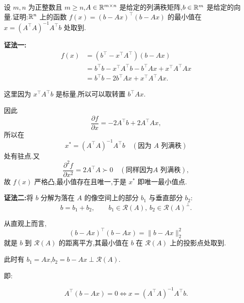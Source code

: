 \begin{problem}
设 $m,n$ 为正整数且 $m\ge n$,$A\in\mathbb{R}^{m\times n}$ 是给定的列满秩矩阵,$b\in\mathbb{R}^m$ 是给定的向量.证明:$\mathbb{R}^n$ 上的函数
\(
f(x)=(b-Ax)^\top(b-Ax)
\)
的最小值在
\(
x=(A^\top A)^{-1}A^\top b
\)
处取到.
\begin{solution}
\textbf{证法一:}
\begin{align*}
    f(x)&=(b^\top-x^\top A^\top)(b-Ax) \\
&=b^\top b-x^\top A^\top b-b^\top Ax+x^\top A^\top Ax \\
&=b^\top b-2b^\top Ax+x^\top A^\top Ax.
\end{align*}

这里因为 $x^\top A^\top b$ 是标量,所以可以取转置 $b^\top Ax$. 

因此
\[
\frac{\partial f}{\partial x}
=-2A^\top b+2A^\top Ax,
\]
所以在
\[
x^\ast=(A^\top A)^{-1}A^\top b
\quad(\text{因为 $A$ 列满秩})
\]
处有驻点.又
\[
\frac{\partial^2 f}{\partial x^2}=2A^\top A\succ0
\quad(\text{同样因为$A$ 列满秩}),
\]
故 $f(x)$ 严格凸,最小值存在且唯一,于是 $x^\ast$ 即唯一最小值点.

\textbf{证法二:}将 $b$ 分解为落在 $A$ 的像空间上的部分 $b_1$ 与垂直部分 $b_2$:
\[
b=b_1+b_2,\qquad b_1\in\mathcal{R}(A),\ b_2\in\mathcal{R}(A)^\perp.
\]

从直观上而言,
\[
(b-Ax)^\top(b-Ax)=\|b-Ax\|_2^2
\]
就是 $b$ 到 $\mathcal{R}(A)$ 的距离平方,其最小值在 $b$ 在 $\mathcal{R}(A)$ 上的投影点处取到.

此时有 $b_1 = Ax$,\quad $b_2 = b - Ax \perp \mathcal{R}(A)$.

即:

\[
A^\top (b - Ax) = 0 \Leftrightarrow x=(A^\top A)^{-1}A^\top b.
\]

\end{solution}
\end{problem}


